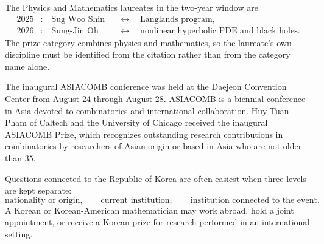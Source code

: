     \begin{fact}
        The Physics and Mathematics laureates in the two-year window are
        \[
            \begin{aligned}
                2025&:\quad \text{Sug Woo Shin}
                &&\longleftrightarrow\quad \text{Langlands program},\\
                2026&:\quad \text{Sung-Jin Oh}
                &&\longleftrightarrow\quad \text{nonlinear hyperbolic PDE and black holes}.
            \end{aligned}
        \]
        The prize category combines physics and mathematics, so the laureate's
        own discipline must be identified from the citation rather than from the
        category name alone.
    \end{fact}

    \begin{fact}
        The inaugural ASIACOMB conference was held at the Daejeon Convention
        Center from August 24 through August 28. ASIACOMB is a biennial
        conference in Asia devoted to combinatorics and international
        collaboration. Huy Tuan Pham of Caltech and the University of Chicago
        received the inaugural ASIACOMB Prize, which recognizes outstanding
        research contributions in combinatorics by researchers of Asian origin
        or based in Asia who are not older than $35$.
    \end{fact}

    \begin{strategy}
        Questions connected to the Republic of Korea are often easiest when three levels are kept
        separate:
        \[
            \text{nationality or origin},\qquad
            \text{current institution},\qquad
            \text{institution connected to the event}.
        \]
        A Korean or Korean-American mathematician may work abroad, hold a joint
        appointment, or receive a Korean prize for research performed in an
        international setting.
    \end{strategy}
